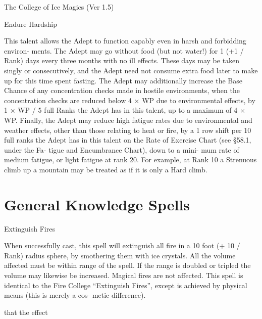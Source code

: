 \begin{Chapter}{The College of Ice Magics (Ver 1.5)}
\begin{talent}[T-2]{Endure Hardship }
\begin{effects}
 This  talent  allows  the  Adept  to  function 
capably  even  in  harsh  and  forbidding  environ-
ments.  The  Adept  may  go  without  food  (but  not 
water!) for 1 (+1 / Rank) days  every three months 
with no ill effects. These days may be taken singly 
or consecutively, and the Adept need not consume 
extra  food  later  to  make  up  for  this  time  spent 
fasting.  The  Adept  may  additionally  increase  the 
Base Chance of any concentration checks made in 
hostile  environments,  when 
the  concentration checks are reduced below 4 × WP due to environmental effects, by 1 × WP / 5 full Ranks the Adept 
has  in  this  talent,  up  to  a  maximum  of  4  ×  WP. 
Finally,  the  Adept  may  reduce  high  fatigue  rates 
due  to  environmental  and  weather  effects,  other 
than those relating to heat or fire, by a 1 row shift 
per 10 full ranks the Adept has in this talent on the 
Rate  of  Exercise  Chart  (see  §58.1,  under  the  Fa-
tigue  and  Encumbrance  Chart),  down  to  a  mini-
mum  rate  of  medium  fatigue,  or  light  fatigue  at 
rank  20.  For  example,  at  Rank  10  a  Strenuous 
climb up a mountain may be treated as if it is only 
a Hard climb. 


\end{effects}
\end{talent}

\section{General Knowledge Spells}

\begin{spell}[G-1]{Extinguish Fires }

\begin{effects}
 When  successfully  cast,  this  spell  will 
extinguish all fire in a 10 foot (+ 10 / Rank) radius 
sphere,  by  smothering  them  with  ice  crystals.  All 
the  volume  affected  must  be  within  range  of  the 
spell. If the range is doubled or tripled the volume 
may  likewise  be  increased.  Magical  fires  are  not 
affected.  This  spell  is  identical  to the  Fire  College 
“Extinguish  Fires”,  except 
is 
achieved  by  physical  means  (this  is  merely  a  cos-
metic difference). 

that  the  effect 


\end{effects}
\end{spell}
\end{Chapter}
